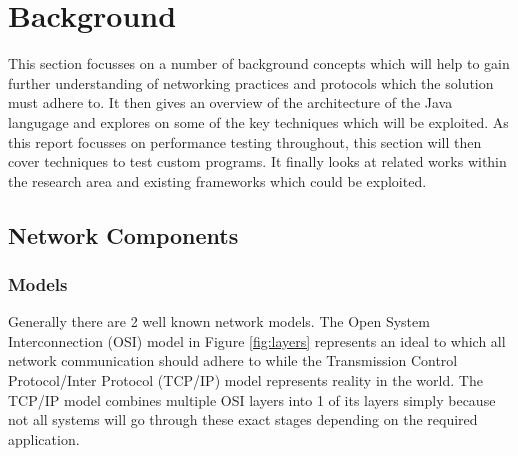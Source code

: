 \documentclass[final_report.tex]{subfiles}
\begin{document}

\section{Background}

This section focusses on a number of background concepts which will help to gain further understanding of networking practices and protocols which the solution must adhere to. It then gives an overview of the architecture of the Java langugage and explores on some of the key techniques which will be exploited. As this report focusses on performance testing throughout, this section will then cover techniques to test custom programs. It finally looks at related works within the research area and existing frameworks which could be exploited.

\subsection{Network Components}


\subsubsection{Models}
\label{sec:models}
Generally there are 2 well known network models. The Open System Interconnection (OSI) model in Figure \ref{fig:layers} represents an ideal to which all network communication should adhere to while the Transmission Control Protocol/Inter Protocol (TCP/IP) model represents reality in the world. The TCP/IP model combines multiple OSI layers into 1 of its layers simply because not all systems will go through these exact stages depending on the required  application.
\end{document}
